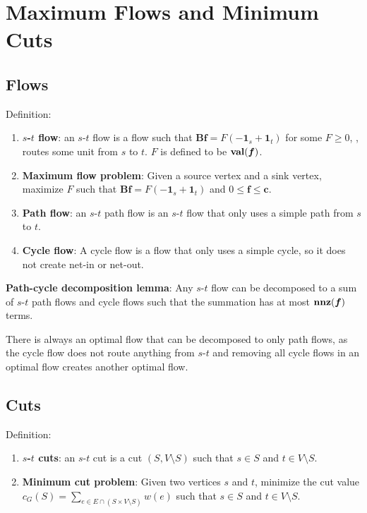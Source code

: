 \section{Maximum Flows and Minimum Cuts}

\subsection{Flows}
Definition:
\begin{enumerate}
    \item \textbf{$s$-$t$ flow}: an $s$-$t$ flow is a flow such that $\boldsymbol{B}\boldsymbol{f} = F (-\boldsymbol{1}_s + \boldsymbol{1}_t)$ for some $F\ge 0$, \ie, routes some unit from $s$ to $t$. $F$ is defined to be $\operatorname{\textbf{val}}(\boldsymbol{f})$.
    \item \textbf{Maximum flow problem}: Given a source vertex and a sink vertex, maximize $F$ such that $\boldsymbol{B}\boldsymbol{f} = F (-\boldsymbol{1}_s + \boldsymbol{1}_t)$ and $0 \le \boldsymbol{f} \le \boldsymbol{c}$.
    \item \textbf{Path flow}: an $s$-$t$ path flow is an $s$-$t$ flow that only uses a simple path from $s$ to $t$.
    \item \textbf{Cycle flow}: A cycle flow is a flow that only uses a simple cycle, so it does not create net-in or net-out.
\end{enumerate}

\textbf{Path-cycle decomposition lemma}: Any $s$-$t$ flow can be decomposed to a sum of $s$-$t$ path flows and cycle flows such that the summation has at most $\operatorname{\textbf{nnz}}(\boldsymbol{f})$ terms.

There is always an optimal flow that can be decomposed to only path flows, as the cycle flow does not route anything from $s$-$t$ and removing all cycle flows in an optimal flow creates another optimal flow.

\subsection{Cuts}

Definition:
\begin{enumerate}
    \item \textbf{$s$-$t$ cuts}: an $s$-$t$ cut is a cut $(S, V\setminus S)$ such that $s \in S$ and $t \in V\setminus S$.
    \item \textbf{Minimum cut problem}: Given two vertices $s$ and $t$, minimize the cut value $c_G(S)=\sum_{e \in E \cap (S\times V\setminus S)} w(e)$ such that $s \in S$ and $t \in V\setminus S$.
\end{enumerate}

